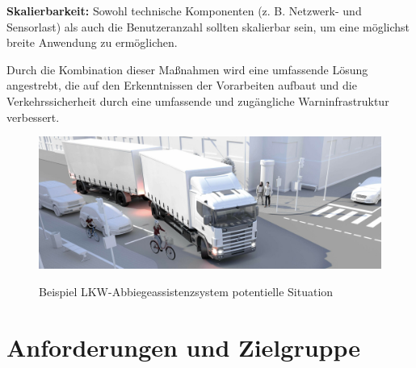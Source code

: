\documentclass[a4paper, 12pt]{article} %
\begin{document}
\begin{spacing}{1.8}
\textbf{Skalierbarkeit:}  Sowohl technische Komponenten (z. B. Netzwerk- und Sensorlast) als auch die Benutzeranzahl sollten skalierbar sein, um eine möglichst breite Anwendung zu ermöglichen.

Durch die Kombination dieser Maßnahmen wird eine umfassende Lösung angestrebt, die auf den Erkenntnissen der Vorarbeiten aufbaut und die Verkehrssicherheit durch eine umfassende und zugängliche Warninfrastruktur verbessert.

\begin{figure}[H]
    \includegraphics[width=1\linewidth]{images/abbiegeassistent-scaled-7b2478b8.jpeg}\\[1ex]
    \centering
    \caption{Beispiel LKW-Abbiegeassistenzsystem potentielle Situation\cite{abbiegeassistent_website}}
    \label{ABBILDUNG 76}
\end{figure}

\end{spacing}

\clearpage

\section{Anforderungen und Zielgruppe}
\end{document}
